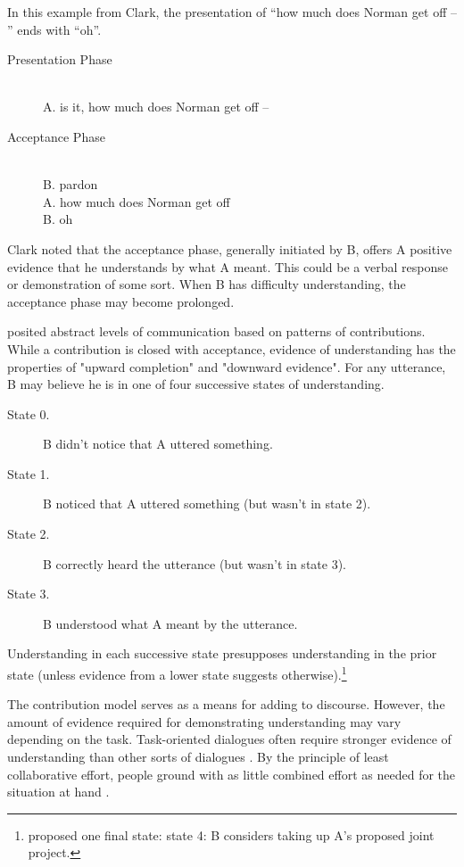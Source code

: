 In this example from Clark, the presentation of ``how much does Norman get off -- '' ends with ``oh''.

\begin{description}
\item[Presentation Phase] \hfill \\
A. is it, how much does Norman get off --
\item[Acceptance Phase]  \hfill \\
B. pardon \\
A. how much does Norman get off \\
B. oh
\end{description}

Clark noted that the acceptance phase, generally initiated by B, offers A positive evidence that he understands by what A meant. This could be a verbal response or demonstration of some sort. When B has difficulty understanding, the acceptance phase may become prolonged.

\begin{sloppier}
\cite{Clark:1989ur} posited abstract levels of communication based on patterns of contributions. While a contribution is closed with acceptance, evidence of understanding has the properties of "upward completion" and "downward evidence". For any utterance, B may believe he is in one of four successive states of understanding.
\end{sloppier}
\begin{description}
\item[State 0.] B didn't notice that A uttered something.
\item[State 1.] B noticed that A uttered something  (but wasn't in state 2).
\item[State 2.] B correctly heard the utterance (but wasn't in state 3).
\item[State 3.] B understood what A meant by the utterance.
\end{description}

Understanding in each successive state presupposes understanding in the prior  state (unless evidence from a lower state suggests otherwise).\footnote{\citep{Clark:1996tm} proposed one final state: state 4: B considers taking up A's proposed joint project.} 

The contribution model serves as a means for adding to discourse. However, the amount of evidence required for demonstrating understanding may vary depending on the task. Task-oriented dialogues often require stronger evidence of understanding than other sorts of dialogues  \citep{Clark:1986uw}.  By the principle of least collaborative effort, people ground with as little combined effort as needed for the situation at hand  \citep{Brennan:1996ud}.  

